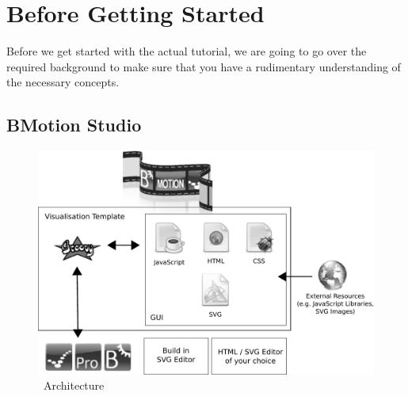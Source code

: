 \section{Before Getting Started}
\label{tutorial_01}

Before we get started with the actual tutorial, we are going to go over the required background to make sure that you have a rudimentary understanding of the necessary concepts.


\subsection{BMotion Studio}

\begin{figure}[!ht]
\begin{center}
	\includegraphics[width=14cm]{img/tutorial/bms_architecture}
	\caption{\bms~Architecture}
	\label{fig_tut_00_architecture}
\end{center}
\end{figure}

